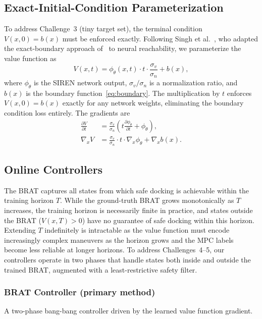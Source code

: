\documentclass[letterpaper, 10 pt, conference]{ieeeconf}
\begin{document}
\subsection{Exact-Initial-Condition Parameterization}\label{sec:exact_ic}

To address Challenge~3 (tiny target set), the terminal condition $V(x,0) = b(x)$ must be enforced exactly. Following Singh et al.~\cite{singh2025exact}, who adapted the exact-boundary approach of~\cite{lagaris1998} to neural reachability, we parameterize the value function as
\begin{equation}\label{eq:exact}
V(x, t) = \phi_\theta(x, t) \cdot t \cdot \frac{\sigma_v}{\sigma_n} + b(x),
\end{equation}
where $\phi_\theta$ is the SIREN network output, $\sigma_v/\sigma_n$ is a normalization ratio, and $b(x)$ is the boundary function~\eqref{eq:boundary}. The multiplication by $t$ enforces $V(x,0) = b(x)$ exactly for any network weights, eliminating the boundary condition loss entirely. The gradients are
\begin{align}\label{eq:exact_grads}
\frac{\partial V}{\partial t} &= \frac{\sigma_v}{\sigma_n}\!\left(t \frac{\partial \phi_\theta}{\partial t} + \phi_\theta\right)\!,\\
\nabla_x V &= \frac{\sigma_v}{\sigma_n} \cdot t \cdot \nabla_x \phi_\theta + \nabla_x b(x). \nonumber
\end{align}

\subsection{Online Controllers}\label{sec:controllers}
The BRAT captures all states from which safe docking is achievable within the training horizon $T$. While the ground-truth BRAT grows monotonically as $T$ increases, the training horizon is necessarily finite in practice, and states outside the BRAT ($V(x, T) > 0$) have no guarantee of safe docking within this horizon. Extending $T$ indefinitely is intractable as the value function must encode increasingly complex maneuvers as the horizon grows and the MPC labels become less reliable at longer horizons. To address Challenges~4--5, our controllers operate in two phases that handle states both inside and outside the trained BRAT, augmented with a least-restrictive safety filter.

\subsubsection{BRAT Controller (primary method)}
A two-phase bang-bang controller driven by the learned value function gradient.
\end{document}
